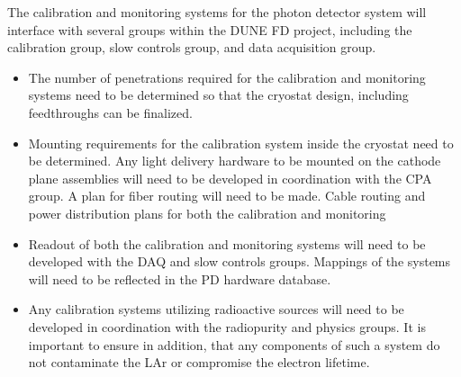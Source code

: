 The calibration and monitoring systems for the photon detector system will interface with several groups within the DUNE FD project, including the calibration group, slow controls group, and data acquisition group.

\begin{itemize}
\item The number of penetrations required for the calibration and monitoring systems need to be determined so that the cryostat design, including feedthroughs can be finalized.
\item Mounting requirements for the calibration system inside the cryostat need to be determined. Any light delivery hardware to be mounted on the cathode plane assemblies will need to be developed in coordination with the CPA group. A plan for fiber routing will need to be made. Cable routing and power distribution plans for both the calibration and monitoring
\item Readout of both the calibration and monitoring systems will need to be developed with the DAQ and slow controls groups. Mappings of the systems will need to be reflected in the PD hardware database.
\item Any calibration systems utilizing radioactive sources will need to be developed in coordination with the radiopurity and physics groups. It is important to ensure in addition, that any components of such a system do not contaminate the LAr or compromise the electron lifetime.
\end{itemize}
 


